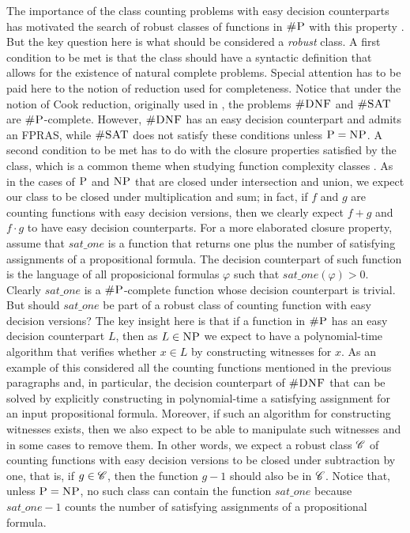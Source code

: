 The importance of the class counting problems with easy decision counterparts has motivated the search of robust classes of functions in $\text{\sc \#P}$ with this property \cite{PagourtzisZ06}. But the key question here is what should be considered a {\em robust} class. A first condition to be met is that the class should have a syntactic definition that allows for the existence of natural complete problems. Special attention has to be paid here to the notion of reduction used for completeness. Notice that under the notion of Cook reduction, originally used in \cite{Valiant79}, the problems $\textsc{\#DNF}$ and $\textsc{\#SAT}$ are $\text{\sc \#P}$-complete. However, $\textsc{\#DNF}$ has an easy decision counterpart and admits an FPRAS, while $\textsc{\#SAT}$ does not satisfy these conditions unless $\text{\sc P} = \text{\sc NP}$. A second condition to be met has to do with the closure properties satisfied by the class, which is a common theme when studying function complexity classes \cite{OH93,FH08}. As in the cases of $\text{\sc P}$ and $\text{\sc NP}$ that are closed under intersection and union, we expect our class to be closed under multiplication and sum; in fact, if $f$ and $g$ are counting functions with easy decision versions, then we clearly expect $f + g$ and $f \cdot g$ to have easy decision counterparts. For a more elaborated closure property, assume that $\textit{sat\_one}$ is a function that returns one plus the number of satisfying assignments of a propositional formula. The decision counterpart of such function is the language of all proposicional formulas $\varphi$ such that $\textit{sat\_one}(\varphi) > 0$. Clearly $\textit{sat\_one}$ is a $\text{\sc \#P}$-complete function whose decision counterpart is trivial. But should $\textit{sat\_one}$ be part of a robust class of counting function with easy decision versions? The key insight here is that if a function in $\text{\sc \#P}$ has an easy decision counterpart $L$, then as $L \in \text{\sc NP}$ we expect  to have a polynomial-time algorithm that verifies whether $x \in L$ by constructing witnesses for $x$. As an example of this considered all the counting functions mentioned in the previous paragraphs and, in particular, the decision counterpart of $\textsc{\#DNF}$ that can be solved by explicitly constructing in polynomial-time a satisfying assignment for an input propositional formula. Moreover, if such an algorithm for constructing witnesses exists, then we also expect to be able to manipulate such witnesses and in some cases to remove them. In other words, we expect a robust class $\mathscr{C}$ of counting functions with easy decision versions to be closed under subtraction by one, that is, if $g \in \mathscr{C}$, then the function $g - 1$ should also be in $\mathscr{C}$. Notice that, unless $\text{\sc P} = \text{\sc NP}$, no such class can contain the function $\textit{sat\_one}$ because $\textit{sat\_one} - 1$ counts the number of satisfying assignments of a propositional formula. 

